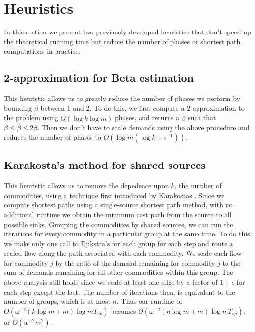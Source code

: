 \section{Heuristics}
In this section we present two  previously developed heuristics that don't speed up the
theoretical running time but reduce the number of phases or shortest
path computations in practice.
\subsection{2-approximation for Beta estimation}
This heuristic allows us to greatly reduce the number of phases we
perform by bounding $\beta$ between 1 and 2. To do this, we first
compute a 2-approximation to the problem using $O(\log k \log m)$
phases, and returns a $\hat{\beta}$ such that $\beta\leq \hat{\beta}\leq2\beta$. Then we don't have to scale demands using the above procedure
and reduces the number of phases to $O(\log m(\log k+\epsilon^{-1}))$.

\subsection{Karakosta's method for shared sources}
This heuristic allows us to remove the depedence upon $k$, the number
of commodities, using a technique first introduced by Karakostas \cite{karakostas}. 
Since
we compute shortest paths using a single-source shortest path method,
with no additional runtime we obtain the minimum cost path from the
source to all possible sinks. Grouping the commodities by shared
sources, we can run the iterations for every commodity in a particular
group at the same time. To do this we make only one call to Djikstra's
for each group for each step and route a scaled flow along the path
associated with each commodity. We scale each flow for commodity $j$
by the ratio of the demand remaining for commodity $j$ to the sum of
demands remaining for all other commodities within this group. The
above analysis still holds since we scale at least one edge by a
factor of $1+\epsilon$ for each step except the last. The number of
iterations then, is equivalent to the number of groups, which is at most
$n$. Thus our runtime of $O(\omega^{-2}(k\log m+m)\log m T_{sp})$
becomes $O(\omega^{-2}(n\log m+m)\log m T_{sp})$, or $\tilde{O}(w^{-2}m^2)$.
